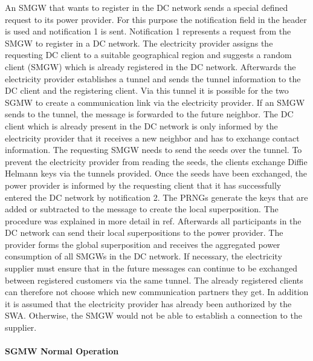 An SMGW that wants to register in the DC network sends a special defined request to its power provider. For this purpose the notification field in the header is used and notification 1 is sent. Notification 1 represents a request from the SMGW to register in a DC network. The electricity provider assigns the requesting DC client to a suitable geographical region and suggests a random client (SMGW) which is already registered in the DC network. Afterwards the electricity provider establishes a tunnel and sends the tunnel information to the DC client and the registering client. Via this tunnel it is possible for the two SGMW to create a communication link via the electricity provider. If an SMGW sends to the tunnel, the message is forwarded to the future neighbor. The DC client which is already present in the DC network is only informed by the electricity provider that it receives a new neighbor and has to exchange contact information. The requesting SMGW needs to send the seeds over the tunnel. To prevent the electricity provider from reading the seeds, the clients exchange Diffie Helmann keys via the tunnels provided.%
Once the seeds have been exchanged, the power provider is informed by the requesting client that it has successfully entered the DC network by notification 2. The PRNGs generate the keys that are added or subtracted to the message to create the local superposition. The procedure was explained in more detail in ref.%
Afterwards all participants in the DC network can send their local superpositions to the power provider. The provider forms the global superposition and receives the aggregated power consumption of all SMGWs in the DC network. If necessary, the electricity supplier must ensure that in the future messages can continue to be exchanged between registered customers via the same tunnel. The already registered clients can therefore not choose which new communication partners they get. In addition it is assumed that the electricity provider has already been authorized by the SWA. Otherwise, the SMGW would not be able to establish a connection to the supplier.\\
\\
\textbf{SGMW Normal Operation}
\\
\\
